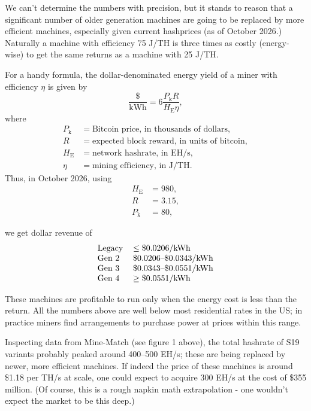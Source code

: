 \documentclass{article}%
\begin{document}
We can't determine the numbers with precision, but it stands to
reason that a significant number of older generation machines are going to be
replaced by more efficient machines, especially given current hashprices (as
of October 2026.) Naturally a machine with efficiency 75 J/TH is three
times as costly (energy-wise) to get the same returns as a machine with 25
J/TH.


For a handy formula, the dollar-denominated energy yield of a miner with efficiency $\eta$ is given by \[ \frac{\$}{\mathrm{kWh}} =6\frac{P_{\mathrm{k}}R}{H_{\mathrm{E}}\eta}, \] where \begin{align*} P_{\mathrm{k}} &= \text{Bitcoin price, in thousands of dollars},\\ R &= \text{expected block reward, in units of bitcoin},\\ H_{\mathrm{E}} &= \text{network hashrate, in EH/s},\\ \eta &= \text{mining efficiency, in J/TH}. \end{align*} Thus, in October 2026, using \begin{align*} H_{\mathrm{E}} &= 980,\\ R &= 3.15,\\ P_{\mathrm{k}} &= 80, \end{align*}

we get dollar revenue of \[ \begin{tabular}[c]{ll} Legacy & $\leq \$0.0206/\mathrm{kWh}$\\ Gen 2 & $\$0.0206$--$\$0.0343/\mathrm{kWh}$\\ Gen 3 & $\$0.0343$--$\$0.0551/\mathrm{kWh}$\\ Gen 4 & $\geq \$0.0551/\mathrm{kWh}$ \end{tabular} \]

These machines are profitable to run only when the energy cost is less than
the return.  All the numbers above are well below most residential rates in the US; in practice miners
find arrangements to purchase power at prices within this range.

Inspecting data from Mine-Match (see figure 1 above), the total
hashrate of S19 variants probably peaked around 400--500 EH/s; these are being
replaced by newer, more efficient machines.  If indeed the price of these
machines is around \$1.18 per TH/s at scale, one could expect to acquire 300
EH/s at the cost of \$355 million.  (Of course,  this is a rough napkin math extrapolation - one wouldn't expect
the market to be this deep.)
\end{document}
